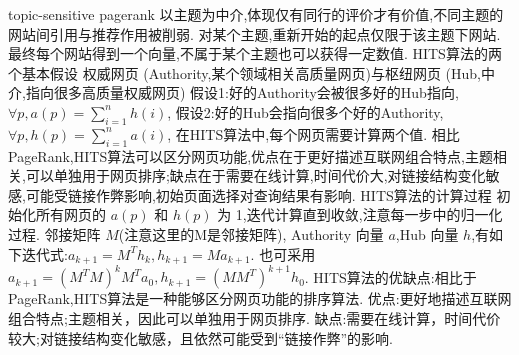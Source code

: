 \documentclass[10pt, utf8]{ctexart}
\begin{document}
\begin{multicols}{4}
    {\color{blue}topic-sensitive pagerank}
    以主题为中介,体现仅有同行的评价才有价值,不同主题的网站间引用与推荐作用被削弱.
    对某个主题,重新开始的起点仅限于该主题下网站.最终每个网站得到一个向量,不属于某个主题也可以获得一定数值.
    {\color{blue}HITS算法的两个基本假设}
    权威网页 (Authority,某个领域相关高质量网页)与枢纽网页 (Hub,中介,指向很多高质量权威网页)
    假设1:好的Authority会被很多好的Hub指向,$\forall p,a(p)=\sum_{i=1}^{n}h(i)$,
    假设2:好的Hub会指向很多个好的Authority,$\forall p,h(p)=\sum_{i=1}^{n}a(i)$,
    在HITS算法中,每个网页需要计算两个值.
    相比 PageRank,HITS算法可以区分网页功能,优点在于更好描述互联网组合特点,主题相关,可以单独用于网页排序;缺点在于需要在线计算,时间代价大,对链接结构变化敏感,可能受链接作弊影响,初始页面选择对查询结果有影响.
    {\color{red}HITS算法的计算过程}
    初始化所有网页的 $a(p)$ 和 $h(p)$ 为 1,迭代计算直到收敛,{\color{red}注意每一步中的归一化过程}.
    邻接矩阵 $M$({\color{red}注意这里的M是邻接矩阵}), Authority 向量 $a$,Hub 向量 $h$,有如下迭代式:$a_{k+1} = M^T h_k,h_{k+1} = Ma_{k+1}$.
    也可采用 $a_{k+1} = (M^TM)^kM^Ta_0,h_{k+1} = (MM^T)^{k+1}h_0$.
    HITS算法的优缺点:相比于PageRank,HITS算法是一种能够区分网页功能的排序算法.
    优点:更好地描述互联网组合特点;主题相关，因此可以单独用于网页排序.
    缺点:需要在线计算，时间代价较大;对链接结构变化敏感，且依然可能受到“链接作弊”的影响.


\end{multicols}
\end{document}

